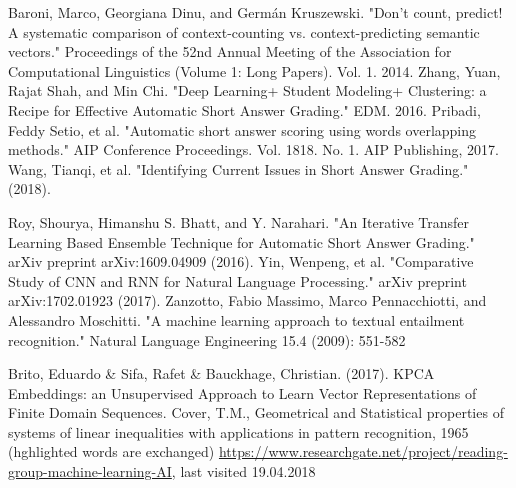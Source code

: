 \documentclass[rnd]{mas_report}
\begin{document}
\begin{thebibliography}{3}
  Baroni, Marco, Georgiana Dinu, and Germán Kruszewski. "Don't count, predict! A systematic comparison of context-counting vs. context-predicting semantic vectors." Proceedings of the 52nd Annual Meeting of the Association for Computational Linguistics (Volume 1: Long Papers). Vol. 1. 2014.
 Zhang, Yuan, Rajat Shah, and Min Chi. "Deep Learning+ Student Modeling+ Clustering: a Recipe for Effective Automatic Short Answer Grading." EDM. 2016.
 Pribadi, Feddy Setio, et al. "Automatic short answer scoring using words overlapping methods." AIP Conference Proceedings. Vol. 1818. No. 1. AIP Publishing, 2017.
 Wang, Tianqi, et al. "Identifying Current Issues in Short Answer Grading." (2018).


 Roy, Shourya, Himanshu S. Bhatt, and Y. Narahari. "An Iterative Transfer Learning Based Ensemble Technique for Automatic Short Answer Grading." arXiv preprint arXiv:1609.04909 (2016).
 Yin, Wenpeng, et al. "Comparative Study of CNN and RNN for Natural Language Processing." arXiv preprint arXiv:1702.01923 (2017).
 Zanzotto, Fabio Massimo, Marco Pennacchiotti, and Alessandro Moschitti. "A machine learning approach to textual entailment recognition." Natural Language Engineering 15.4 (2009): 551-582


 Brito, Eduardo \& Sifa, Rafet \& Bauckhage, Christian. (2017). KPCA Embeddings: an Unsupervised Approach to Learn Vector Representations of Finite Domain Sequences.
 Cover, T.M., Geometrical and Statistical properties of systems of linear inequalities with applications in pattern recognition, 1965 (hghlighted words are exchanged)
 \url{https://www.researchgate.net/project/reading-group-machine-learning-AI}, last visited 19.04.2018


\end{thebibliography}
\end{document}
